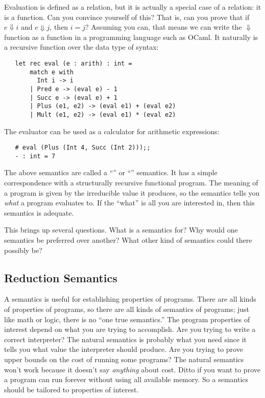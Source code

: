 Evaluation is defined as a relation, but it is actually a special case
of a relation: it is a function.  Can you convince yourself of this?
That is, can you prove that if $e \Downarrow i$ and $e \Downarrow j$,
then $i=j$?  Assuming you can, that means we can write the
$\Downarrow$ function as a function in a programming language such as
OCaml.  It naturally is a recursive function over the data type of
syntax:
\begin{verbatim}
   let rec eval (e : arith) : int =
       match e with
         Int i -> i
       | Pred e -> (eval e) - 1
       | Succ e -> (eval e) + 1
       | Plus (e1, e2) -> (eval e1) + (eval e2)
       | Mult (e1, e2) -> (eval e1) * (eval e2)
\end{verbatim}

The evaluator can be used as a calculator for arithmetic expressions:
\begin{verbatim}
   # eval (Plus (Int 4, Succ (Int 2)));;
   - : int = 7
\end{verbatim}

The above semantics are called a ``'' or ``''
semantics.  It has a simple correspondence with a structurally
recursive functional program.
The meaning of a program is given by the irreducible value it
produces, so the semantics tells you \emph{what} a program evaluates
to.  If the ``what'' is all you are interested in, then this semantics
is adequate.

This brings up several questions.  What is a semantics for?  Why would
one semantics be preferred over another?  What other kind of semantics
could there possibly be?

\subsection{Reduction Semantics}

A semantics is useful for establishing properties of programs.  There
are all kinds of properties of programs, so there are all kinds of
semantics of programs; just like math or logic, there is no ``one true
semantics.''  The program properties of interest depend on what you
are trying to accomplish.  Are you trying to write a correct
interpreter?  The natural semantics is probably what you need since it
tells you what value the interpreter should produce.  Are you trying
to prove upper bounds on the cost of running some programs?  The
natural semantics won't work because it doesn't say \emph{anything}
about cost.  Ditto if you want to prove a program can run forever
without using all available memory.  So a semantics should be tailored
to properties of interest.

